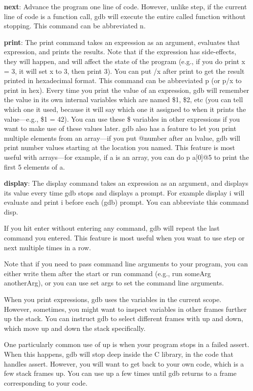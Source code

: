 \documentclass[11pt, a4paper]{article}
\begin{document}
\textbf{next}: Advance the program one line of code. However, unlike step, if the current line of code is a function call, gdb will execute the entire called function without stopping. This command can be abbreviated n.

\textbf{print}: The print command takes an expression as an argument, evaluates that expression, and prints the results. Note that if the expression has side-effects, they will happen, and will affect the state of the program (e.g., if you do print x = 3, it will set x to 3, then print 3). You can put /x after print to get the result printed in hexadecimal format. This command can be abbreviated p (or p/x to print in hex). Every time you print the value of an expression, gdb will remember the value in its own internal variables which are named \$1, \$2, etc (you can tell which one it used, because it will say which one it assigned to when it prints the value—e.g., \$1 = 42). You can use these \$ variables in other expressions if you want to make use of these values later. gdb also has a feature to let you print multiple elements from an array—if you put @number after an lvalue, gdb will print number values starting at the location you named. This feature is most useful with arrays—for example, if a is an array, you can do p a[0]@5 to print the first 5 elements of a.

\textbf{display}: The display command takes an expression as an argument, and displays its value every time gdb stops and displays a prompt. For example display i will evaluate and print i before each (gdb) prompt. You can abbreviate this command disp.

If you hit enter without entering any command, gdb will repeat the last command you entered. This feature is most useful when you want to use step or next multiple times in a row.

Note that if you need to pass command line arguments to your program, you can either write them after the start or run command (e.g., run someArg anotherArg), or you can use set args to set the command line arguments.



When you print expressions, gdb uses the variables in the current scope. However, sometimes, you might want to inspect variables in other frames further up the stack. You can instruct gdb to select different frames with up and down, which move up and down the stack specifically.

One particularly common use of up is when your program stops in a failed assert. When this happens, gdb will stop deep inside the C library, in the code that handles assert. However, you will want to get back to your own code, which is a few stack frames up. You can use up a few times until gdb returns to a frame corresponding to your code.
\end{document}

